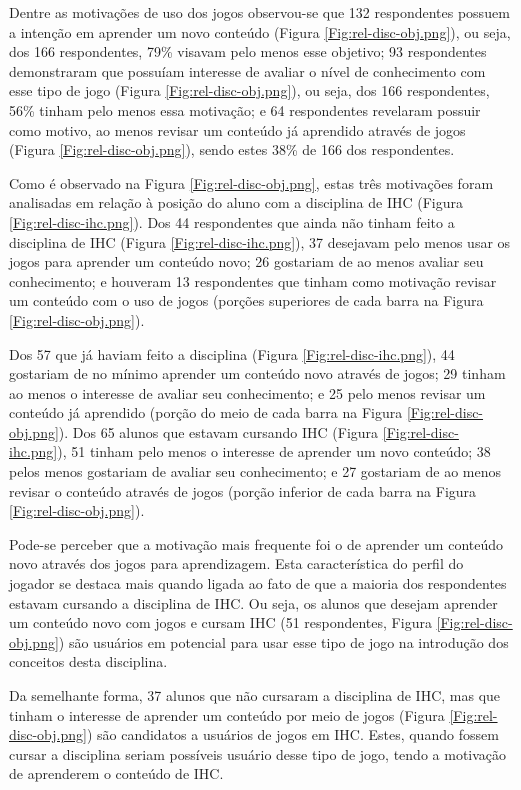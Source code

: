 Dentre as motivações de uso dos jogos observou-se que 132 respondentes possuem a intenção em aprender um novo conteúdo (Figura \ref{Fig:rel-disc-obj.png}), ou seja, dos 166 respondentes, 79\% visavam pelo menos esse objetivo; 93 respondentes demonstraram que possuíam interesse de avaliar o nível de conhecimento com esse tipo de jogo (Figura \ref{Fig:rel-disc-obj.png}), ou seja, dos 166 respondentes, 56\% tinham pelo menos essa motivação; e 64 respondentes revelaram possuir como motivo, ao menos revisar um conteúdo já aprendido através de jogos (Figura \ref{Fig:rel-disc-obj.png}), sendo estes 38\% de 166 dos respondentes. 

Como é observado na Figura \ref{Fig:rel-disc-obj.png}, estas três motivações foram analisadas em relação à posição do aluno com a disciplina de IHC (Figura \ref{Fig:rel-disc-ihc.png}). Dos 44 respondentes que ainda não tinham feito a disciplina de IHC (Figura \ref{Fig:rel-disc-ihc.png}), 37 desejavam pelo menos usar os jogos para aprender um conteúdo novo; 26 gostariam de ao menos avaliar seu conhecimento; e houveram 13 respondentes que tinham como motivação revisar um conteúdo com o uso de jogos (porções superiores de cada barra na Figura \ref{Fig:rel-disc-obj.png}). 

Dos 57 que já haviam feito a disciplina (Figura \ref{Fig:rel-disc-ihc.png}), 44 gostariam de no mínimo aprender um conteúdo novo através de jogos; 29 tinham ao menos o interesse de avaliar seu conhecimento; e 25 pelo menos revisar um conteúdo já aprendido (porção do meio de cada barra na Figura \ref{Fig:rel-disc-obj.png}). Dos 65 alunos que estavam cursando IHC (Figura \ref{Fig:rel-disc-ihc.png}), 51 tinham pelo menos o interesse de aprender um novo conteúdo; 38 pelos menos gostariam de avaliar seu conhecimento; e 27 gostariam de ao menos revisar o conteúdo através de jogos (porção inferior de cada barra na Figura \ref{Fig:rel-disc-obj.png}).

Pode-se perceber que a motivação mais frequente foi o de aprender um conteúdo novo através dos jogos para aprendizagem. Esta característica do perfil do jogador se destaca mais quando ligada ao fato de que a maioria dos respondentes estavam cursando a disciplina de IHC. Ou seja, os alunos que desejam aprender um conteúdo novo com jogos e cursam IHC (51 respondentes, Figura \ref{Fig:rel-disc-obj.png}) são usuários em potencial para usar esse tipo de jogo na introdução dos conceitos desta disciplina. 

Da semelhante forma, 37 alunos que não cursaram a disciplina de IHC, mas que tinham o interesse de aprender um conteúdo por meio de jogos (Figura \ref{Fig:rel-disc-obj.png}) são candidatos a usuários de jogos em IHC. Estes, quando fossem cursar a disciplina seriam possíveis usuário desse tipo de jogo, tendo a motivação de aprenderem o conteúdo de IHC.

